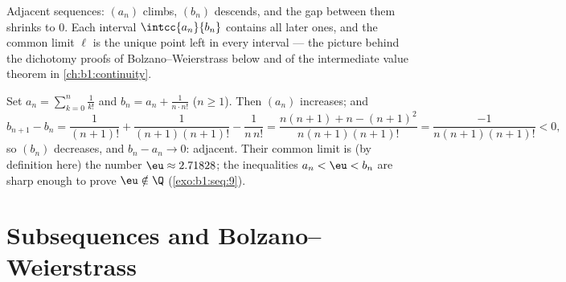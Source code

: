 \begin{omfigure}

{\small Adjacent sequences: $(a_n)$ climbs, $(b_n)$ descends,
and the gap between them shrinks to $0$. Each interval
$\intcc{a_n}{b_n}$ contains all later ones, and the common limit
$\ell$ is the unique point left in every interval --- the
picture behind the dichotomy proofs of Bolzano--Weierstrass
below and of the intermediate value theorem in
\cref{ch:b1:continuity}.}
\end{omfigure}

\begin{example}\label{ex:b1:seq:e}
Set $a_n = \sum_{k=0}^{n} \frac{1}{k!}$ and $b_n = a_n + \frac{1}{n
\cdot n!}$ ($n \geq 1$). Then $(a_n)$ increases; and
\[
b_{n+1} - b_n = \frac{1}{(n+1)!} + \frac{1}{(n+1)(n+1)!} -
\frac{1}{n\,n!}
= \frac{n(n+1) + n - (n+1)^2}{n(n+1)(n+1)!}
= \frac{-1}{n(n+1)(n+1)!} < 0 ,
\]
so $(b_n)$ decreases, and $b_n - a_n \to 0$: adjacent. Their common
limit is (by definition here) the number $\eu \approx 2.71828$; the
inequalities $a_n < \eu < b_n$ are sharp enough to prove $\eu \notin
\Q$ (\cref{exo:b1:seq:9}).
\end{example}

\section{Subsequences and Bolzano--Weierstrass}


